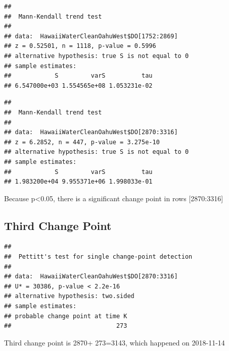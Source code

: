 \documentclass[12pt,]{article}
\newenvironment{Shaded}{\begin{snugshade}}{\end{snugshade}}
\newcommand{\KeywordTok}[1]{\textcolor[rgb]{0.13,0.29,0.53}{\textbf{#1}}}
\newcommand{\DecValTok}[1]{\textcolor[rgb]{0.00,0.00,0.81}{#1}}
\newcommand{\OperatorTok}[1]{\textcolor[rgb]{0.81,0.36,0.00}{\textbf{#1}}}
\newcommand{\NormalTok}[1]{#1}
\begin{document}
\begin{verbatim}
## 
##  Mann-Kendall trend test
## 
## data:  HawaiiWaterCleanOahuWest$DO[1752:2869]
## z = 0.52501, n = 1118, p-value = 0.5996
## alternative hypothesis: true S is not equal to 0
## sample estimates:
##            S         varS          tau 
## 6.547000e+03 1.554565e+08 1.053231e-02
\end{verbatim}

\begin{Shaded}
\end{Shaded}

\begin{verbatim}
## 
##  Mann-Kendall trend test
## 
## data:  HawaiiWaterCleanOahuWest$DO[2870:3316]
## z = 6.2852, n = 447, p-value = 3.275e-10
## alternative hypothesis: true S is not equal to 0
## sample estimates:
##            S         varS          tau 
## 1.983200e+04 9.955371e+06 1.998033e-01
\end{verbatim}

Because p\textless{}0.05, there is a significant change point in rows
{[}2870:3316{]}

\subsection{Third Change Point}\label{third-change-point-1}

\begin{Shaded}
\end{Shaded}

\begin{verbatim}
## 
##  Pettitt's test for single change-point detection
## 
## data:  HawaiiWaterCleanOahuWest$DO[2870:3316]
## U* = 30386, p-value < 2.2e-16
## alternative hypothesis: two.sided
## sample estimates:
## probable change point at time K 
##                             273
\end{verbatim}

Third change point is 2870+ 273=3143, which happened on 2018-11-14
\end{document}
